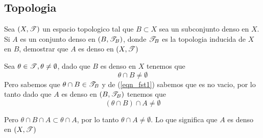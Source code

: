 \documentclass[../main.tex]{subfiles}
\begin{document}
\subsection{Topologia}
\begin{problem}
  Sea $(X, \mathscr{T})$ un espacio topologico tal que $B \subset X$ sea un subconjunto denso en $X$. Si
  $A$ es un conjunto denso en $(B, \mathscr{T}_{B})$, donde $\mathscr{T}_{B}$ es la topologia inducida de $X$ en $B$, demostrar que $A$ es denso en $(X, \mathscr{T})$
\end{problem}
\begin{solution}
  Sea $\theta \in \mathscr{T}, \theta \neq \emptyset$, dado que $B$ es denso en $X$ tenemos que
  \begin{equation}
    \label{eqn_fst1}
    \theta \cap B \neq \emptyset
  \end{equation}
  Pero sabemos que $\theta \cap B \in \mathscr{T}_{B}$ y de (\ref{eqn_fst1}) sabemos que es no vacio, por lo tanto dado que $A$ es denso en $(B, \mathscr{T}_{B})$ tenemos que
  \begin{equation*}
    (\theta \cap B) \cap A \neq \emptyset
  \end{equation*}

  Pero $\theta \cap B \cap A \subset \theta \cap A$, por lo tanto $\theta \cap A \neq \emptyset$.
  Lo que significa que $A$ es denso en $(X, \mathscr{T})$
\end{solution}
\end{document}
